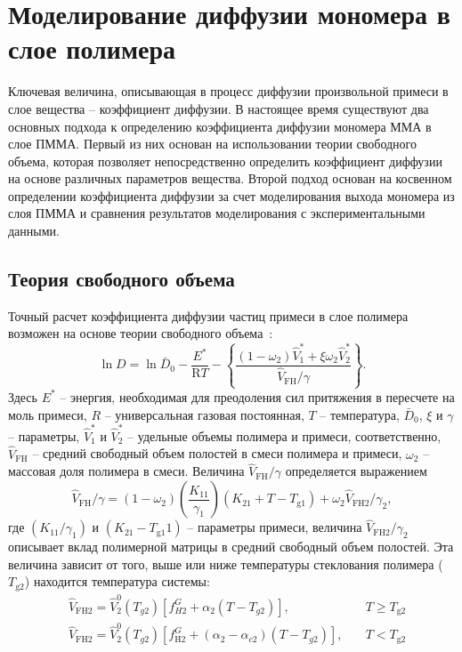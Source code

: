 \section{Моделирование диффузии мономера в слое полимера}
Ключевая величина, описывающая в процесс диффузии произвольной примеси в слое вещества -- коэффициент диффузии. В настоящее время существуют два основных подхода к определению коэффициента диффузии мономера ММА в слое ПММА. Первый из них основан на использовании теории свободного объема, которая позволяет непосредственно определить коэффициент диффузии на основе различных параметров вещества. Второй подход основан на косвенном определении коэффициента диффузии за счет моделирования выхода мономера из слоя ПММА и сравнения результатов моделирования с экспериментальными данными.

\subsection{Теория свободного объема}
Точный расчет коэффициента диффузии частиц примеси в слое полимера возможен на основе теории свободного объема~\cite{Vrentas_free_volume, Zielinski_free_volume}:
\begin{equation}
	\ln D=\ln \bar{D}_0-\frac{E^*}{\mathrm{R} T}-\left\{\frac{\left(1-\omega_2\right) \hat{V}_1^*+\xi \omega_2 \hat{V}_2^*}{\hat{V}_{\mathrm{FH}} / \gamma}\right\}.
\end{equation}
Здесь $E^*$ -- энергия, необходимая для преодоления сил притяжения в пересчете на моль примеси, $R$ -- универсальная газовая постоянная, $T$ -- температура, $\bar{D}_0$, $\xi$ и $\gamma$ -- параметры, $\hat{V}_1^*$ и $\hat{V}_2^*$ -- удельные объемы полимера и примеси, соответственно, $\hat{V}_{\mathrm{FH}}$ -- средний свободный объем полостей в смеси полимера и примеси, $\omega_2$ -- массовая доля полимера в смеси. Величина $\hat{V}_{\mathrm{FH}} / \gamma$ определяется выражением
\begin{equation}
	\hat{V}_{\mathrm{FH}} / \gamma=\left(1-\omega_2\right)\left(\frac{K_{11}}{\gamma_1}\right)\left(K_{21}+T-T_{\mathrm{g} 1}\right)+\omega_2 \hat{V}_{\mathrm{FH} 2} / \gamma_2,
\end{equation}
где $\left(K_{11} / \gamma_1\right)$ и $\left(K_{21}-T_\mathrm{g1} 1\right)$ -- параметры примеси, величина $\hat{V}_{\mathrm{FH} 2} / \gamma_2$ описывает вклад полимерной матрицы в средний свободный объем полостей. Эта величина зависит от того, выше или ниже температуры стеклования полимера ($T_\mathrm{g2}$) находится температура системы:
\begin{equation}
	\begin{aligned}
		&\hat{V}_\mathrm{FH2} =
		\hat{V}_2^0 (T_{g2}) \left[ f_{H2}^{G}+\alpha_2 (T-T_{g2}) \right], & T \geq T_\mathrm{g2} \\
		&\hat{V}_\mathrm{FH2} =
		\hat{V}_2^0 (T_{g2})\left[f_\mathrm{H2}^{G}+(\alpha_2-\alpha_{c2})(T-T_{g2})\right], \hspace{1em} & T<T_\mathrm{g2}
	\end{aligned}
\end{equation}
